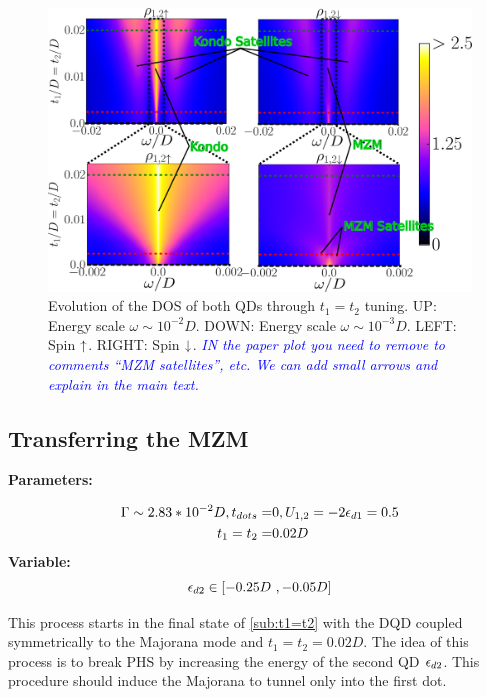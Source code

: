 \documentclass[showpacs,aps,prb,reprint,superscriptaddress]{revtex4-1}
\newcommand{\LUIS}[1]{\textcolor{blue}{\fbox{Luis} {\sl#1}}}
\begin{document}
    \begin{figure}[bt]
        \begin{center}
            \includegraphics[scale=0.26]{Graficos/t1=t2-2D.png}
            \caption{\label{fig:t1=t2-2D}Evolution of the DOS of both QDs through $t_1 = t_2$ tuning. UP: Energy scale $\omega \sim 10^{-2}D$. DOWN: Energy scale $\omega \sim 10^{-3}D$. LEFT: Spin $\uparrow$. RIGHT: Spin $\downarrow$. \LUIS{IN the paper plot you need to remove to comments ``MZM satellites'', etc. We can add small arrows and explain in the main text.}}
            \end{center}
    \end{figure}
    
\subsection{Transferring the MZM \label{sec:e2}}

\textbf{Parameters:}

\begin{align*}
    \Gamma \sim 2.83*10^{-2}D, t_{dots}= & 0 , U_{1,2} = -2\epsilon_{d1} = 0.5 \\
    t_1=t_2=&0.02D
\end{align*}
\textbf{Variable:}
$$\epsilon_{d2} \in [-0.25D \  , -0.05D]$$

This process starts in the final state of \ref{sub:t1=t2} with the DQD coupled symmetrically to the Majorana mode and $t_1=t_2=0.02D$. The idea of this process is to break PHS by increasing the energy of the second QD $\epsilon_{d2}$. This procedure should induce the Majorana to tunnel only into the first dot. \\
\end{document}
